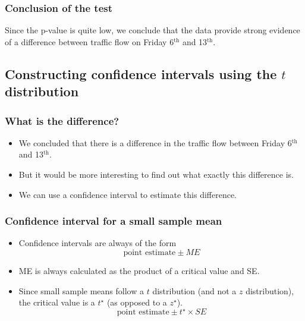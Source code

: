

\begin{frame}
\frametitle{Conclusion of the test}


\pause

Since the p-value is quite low, we conclude that the data provide strong evidence of a difference between traffic flow on Friday 6$^{\text{th}}$ and 13$^{\text{th}}$.

\end{frame}


\subsection{Constructing confidence intervals using the $t$ distribution}


\begin{frame}
\frametitle{What is the difference?}

\begin{itemize}

\item We concluded that there is a difference in the traffic flow between Friday 6$^{\text{th}}$ and 13$^{\text{th}}$.

\pause

\item But it would be more interesting to find out what exactly this difference is.

\pause

\item We can use a confidence interval to estimate this difference.

\end{itemize}

\end{frame}


\begin{frame}
\frametitle{Confidence interval for a small sample mean}

\begin{itemize}

\item Confidence intervals are always of the form
\[ \text{point estimate} \pm {ME} \]

\pause

\item ME is always calculated as the product of a critical value and SE.

\pause

\item Since small sample means follow a $t$ distribution (and not a $z$ distribution), the critical value is a $t^\star$ (as opposed to a $z^\star$).
\[ \text{point estimate} \pm t^{\star} \times SE \]

\end{itemize}

\end{frame}

